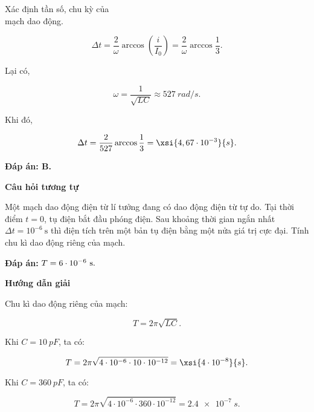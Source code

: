 \begin{dang}{Xác định tần số, chu kỳ của\\ mạch dao động.}
{		$$\Delta t=\dfrac{2}{\omega} \arccos \left(\dfrac{i}{I_{0}}\right)=\dfrac{2}{\omega} \arccos \dfrac{1}{3}.$$
		
		Lại có,
		
		$$\omega=\dfrac{1}{\sqrt{L C}} \approx \SI{527}{rad/s}.$$
		
		Khi đó,
		
		$$\Delta t=\dfrac{2}{527} \arccos \dfrac{1}{3}= \xsi{4,67\cdot10^{-3}}{s}.$$
		
		\textbf{Đáp án: B.}
		
		
		\begin{center}
			\textbf{Câu hỏi tương tự}
		\end{center}
		
		Một mạch dao động điện từ lí tưởng đang có dao động điện từ tự do. Tại thời điểm $t = 0$, tụ điện bắt đầu phóng điện. Sau khoảng thời gian ngắn nhất $\Delta t = 10^{-6}\ \text{s}$ thì điện tích trên một bản tụ điện bằng một nửa giá trị cực đại. Tính chu kì dao động riêng của mạch.
		
		\textbf{Đáp án:} $T = 6 \cdot 10^{-6}\ \text s.$
	}

	{	\begin{center}
			\textbf{Hướng dẫn giải}
		\end{center}
		
		Chu kì dao động riêng của mạch:
		
		$$T=2 \pi \sqrt{L C}.$$
		
		Khi $C=\SI{10}{pF}$, ta có:
		
		$$T=2 \pi \sqrt{4\cdot10^{-6} \cdot 10\cdot10^{-12}}= \xsi{4\cdot10^{-8}}{s}.$$
		
		Khi $C=\SI{360}{pF}$, ta có:
		
		$$T=2 \pi \sqrt{4\cdot10^{-6} \cdot 360\cdot10^{-12}}= \SI{2,4 e-7}{s}.$$
		
}
\end{dang}
